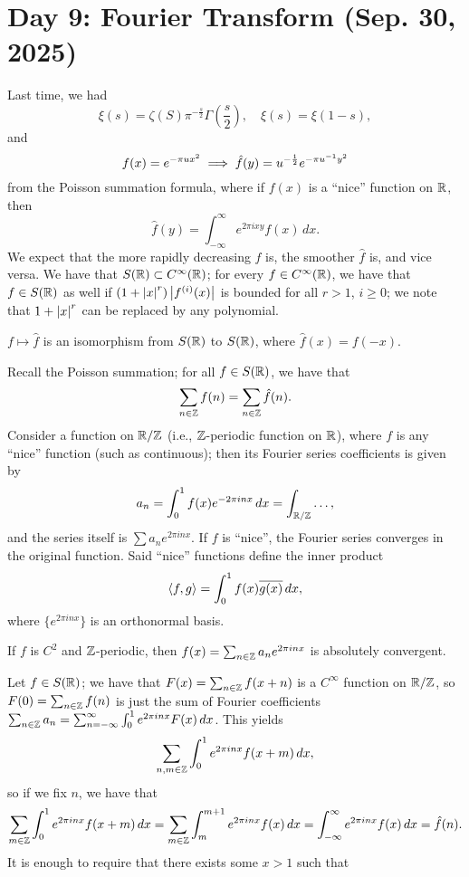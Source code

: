 \section{Day 9: Fourier Transform (Sep. 30, 2025)}
Last time, we had
\[ \xi(s) = \zeta(S) \pi^{-\frac{s}{2}} \Gamma\left(\frac{s}{2}\right), \quad \xi(s) = \xi(1 - s),\]
and
\[ f(x) = e^{-\pi u x^2} \implies \hat f(y) = u^{-\frac{1}{2}} e^{-\pi u^{-1} y^2} \]
from the Poisson summation formula, where if $f(x)$ is a ``nice'' function on $\mathbb R$, then
\[ \hat f(y) = \int_{-\infty}^\infty e^{2\pi i x y} f(x) \, dx. \]
We expect that the more rapidly decreasing $f$ is, the smoother $\hat f$ is, and vice versa. We have that $S(\mathbb R) \subset C^\infty(\mathbb R)$; for every $f \in C^\infty(\mathbb R)$, we have that $f \in S(\mathbb R)$ as well if $(1 + \left\lvert x \right\rvert^r)\left\lvert f^{(i)}(x) \right\rvert$ is bounded for all $r > 1$, $i \geq 0$; we note that $1 + \left\lvert x \right\rvert^r$ can be replaced by any polynomial.
\begin{theorem}
    $f \mapsto \hat f$ is an isomorphism from $S(\mathbb R)$ to $S(\mathbb R)$, where $\hat{f}(x) = f(-x)$.
\end{theorem}
\noindent Recall the Poisson summation; for all $f \in S(\mathbb R)$, we have that
\[ \sum_{n \in \mathbb Z} f(n) = \sum_{n \in \mathbb Z} \hat{f}(n). \]
Consider a function on $\mathbb R/\mathbb Z$ (i.e., $\mathbb Z$-periodic function on $\mathbb R$), where $f$ is any ``nice'' function (such as continuous); then its Fourier series coefficients is given by
\[ a_n = \int_0^1 f(x) e^{-2\pi i n x} \, dx = \int_{\mathbb R/\mathbb Z} \dots, \]
and the series itself is $\sum a_n e^{2\pi i n x}$. If $f$ is ``nice'', the Fourier series converges in the original function. Said ``nice'' functions define the inner product
\[ \left<f, g\right> = \int_0^1 f(x) \overline{g(x)} \, dx, \]
where $\{e^{2\pi i n x}\}$ is an orthonormal basis.
\begin{theorem}
    If $f$ is $C^2$ and $\mathbb Z$-periodic, then $f(x) = \sum_{n \in \mathbb Z} a_n e^{2\pi i n x}$ is absolutely convergent.
\end{theorem}
\noindent Let $f \in S(\mathbb R)$; we have that $F(x) = \sum_{n \in \mathbb Z} f(x + n)$ is a $C^\infty$ function on $\mathbb R/\mathbb Z$, so $F(0) = \sum_{n \in \mathbb Z} f(n)$ is just the sum of Fourier coefficients $\sum_{n \in \mathbb Z} a_n = \sum_{n=-\infty}^{\infty} \int_0^1 e^{2\pi i n x} F(x) \, dx$. This yields
\[\sum_{n, m \in \mathbb Z} \int_0^1 e^{2\pi i n x} f(x+m) \, dx, \]
so if we fix $n$, we have that
\[ \sum_{m \in \mathbb Z} \int_0^1 e^{2\pi i n x} f(x+m) \, dx = \sum_{m \in \mathbb Z} \int_{m}^{m+1} e^{2\pi i n x} f(x) \, dx = \int_{-\infty}^\infty e^{2\pi i n x} f(x) \, dx = \hat{f}(n). \]
It is enough to require that there exists some $x > 1$ such that
